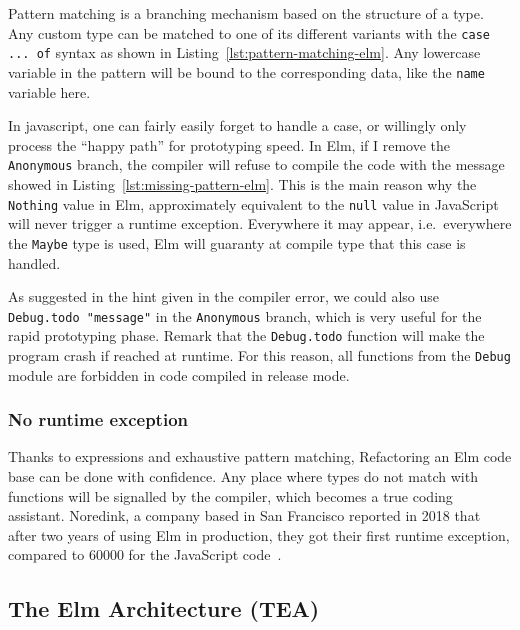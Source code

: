 Pattern matching is a branching mechanism based on the structure of a type.
Any custom type can be matched to one of its different variants
with the \verb|case ... of| syntax as shown in Listing~\ref{lst:pattern-matching-elm}.
Any lowercase variable in the pattern will be bound to the corresponding data,
like the \verb|name| variable here.



In javascript, one can fairly easily forget to handle a case,
or willingly only process the ``happy path'' for prototyping speed.
In Elm, if I remove the \verb|Anonymous| branch,
the compiler will refuse to compile the code
with the message showed in Listing~\ref{lst:missing-pattern-elm}.
This is the main reason why the \verb|Nothing| value in Elm,
approximately equivalent to the \verb|null| value in JavaScript
will never trigger a runtime exception.
Everywhere it may appear, i.e.\ everywhere the \verb|Maybe| type is used,
Elm will guaranty at compile type that this case is handled.



As suggested in the hint given in the compiler error,
we could also use \verb|Debug.todo "message"| in the \verb|Anonymous| branch,
which is very useful for the rapid prototyping phase.
Remark that the \verb|Debug.todo| function will make the program crash
if reached at runtime.
For this reason, all functions from the \verb|Debug| module
are forbidden in code compiled in release mode.


\subsubsection{No runtime exception}%
\label{ssub:no_runtime_exception}

Thanks to expressions and exhaustive pattern matching,
Refactoring an Elm code base can be done with confidence.
Any place where types do not match with functions
will be signalled by the compiler, which becomes a true coding assistant.
Noredink, a company based in San Francisco reported in 2018 that after
two years of using Elm in production,
they got their first runtime exception,
compared to 60000 for the JavaScript code~\cite{zeroruntimeerror}.


\subsection{The Elm Architecture (TEA)}%
\label{sub:the_elm_architecture_tea_}

